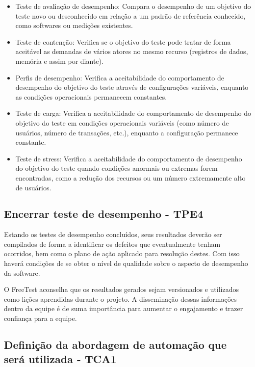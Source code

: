 \begin{itemize}
	\item Teste de avaliação de desempenho: Compara o desempenho de um objetivo do teste novo ou desconhecido em relação a um padrão de referência conhecido, como softwares ou medições existentes.
    \item Teste de contenção: Verifica se o objetivo do teste pode tratar de forma aceitável as demandas de vários atores no mesmo recurso (registros de dados, memória e assim por diante).
    \item Perfis de desempenho: Verifica a aceitabilidade do comportamento de desempenho do objetivo do teste através de configurações variáveis, enquanto as condições operacionais permanecem constantes.
    \item Teste de carga: Verifica a aceitabilidade do comportamento de desempenho do objetivo do teste em condições operacionais variáveis (como número de usuários, número de transações, etc.), enquanto a configuração permanece constante.
    \item Teste de stress: Verifica a aceitabilidade do comportamento de desempenho do objetivo do teste quando condições anormais ou extremas forem encontradas, como a redução dos recursos ou um número extremamente alto de usuários.
\end{itemize}

\subsection{Encerrar teste de desempenho - TPE4}
\label{sec:guiatpe4}

Estando os testes de desempenho concluídos, seus resultados deverão ser compilados de forma a identificar os defeitos que eventualmente tenham ocorridos, bem como o plano de ação aplicado para resolução destes. Com isso haverá condições de se obter o nível de qualidade sobre o aspecto de desempenho da software.

O FreeTest aconselha que os resultados gerados sejam versionados e utilizados como lições aprendidas durante o projeto. A disseminação dessas informações dentro da equipe é de suma importância para aumentar o engajamento e trazer confiança para a equipe.


\subsection{Definição da abordagem de automação que será utilizada - TCA1}
\label{sec:guiatca1}

